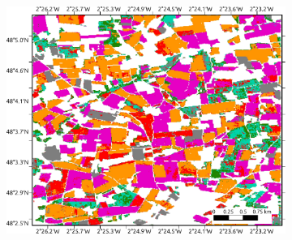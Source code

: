\documentclass[journal,article,submit,pdftex,moreauthors]{Definitions/mdpi}
\providecommand{\DIFdel}[1]{{\protect\color{red}\sout{#1}}}                      %
\providecommand{\DIFdelFL}[1]{\DIFdel{#1}} %
\providecommand{\DIFaddbeginFL}{} %
\providecommand{\DIFaddendFL}{} %
\providecommand{\DIFdelbeginFL}{} %
\providecommand{\DIFdelendFL}{} %
\begin{document}
\begin{figure}[H]
\begin{subfigure}[t]{0.28\linewidth}
	  \includegraphics[height=\linewidth,width=\textwidth]{figures/aes_1_layer_mse_results/prediction_pixel_based_format_v2.pdf}
	\DIFaddendFL \caption{}
	\label{fig:classification_pixel_level}
	\end{subfigure}\DIFdelbeginFL \DIFdelFL{\hspace{-6.5mm} 
	}%
\DIFdelendFL %
	\DIFaddbeginFL \begin{subfigure}[t]{0.28\linewidth}

\end{subfigure}
\end{figure}
\end{document}
